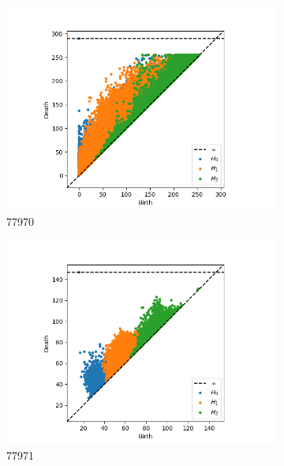 \documentclass[10pt]{beamer}
\begin{document}
\begin{frame}[fragile]{}
\begin{figure}[ht]
  \centering
  \begin{subfigure}{.5 \linewidth}
    \includegraphics[scale=0.3]{persistence_diagrams/77970_multi_ph.png}
    \caption{77970}
  \end{subfigure}%
  \begin{subfigure}{.5 \linewidth}
    \includegraphics[scale=0.3]{persistence_diagrams/77971_multi_ph.png}
    \caption{77971}
  \end{subfigure}
  \begin{subfigure}{.5 \linewidth}

\end{subfigure}
\end{figure}
\end{frame}
\end{document}
